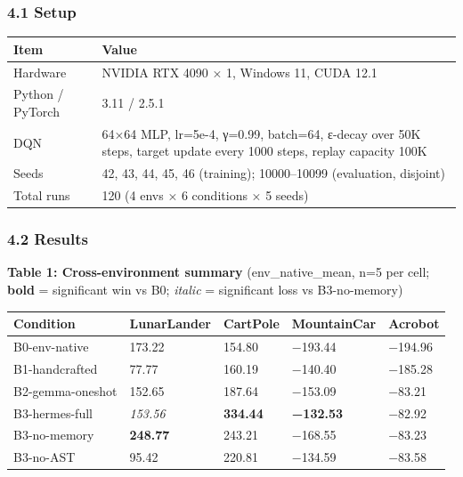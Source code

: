 \subsubsection{4.1 Setup}\label{41-setup}

{\def\LTcaptype{none} %
\begin{longtable}[]{@{}ll@{}}
\toprule\noalign{}
Item & Value \\
\midrule\noalign{}
\endhead
\bottomrule\noalign{}
\endlastfoot
Hardware & NVIDIA RTX 4090 × 1, Windows 11, CUDA 12.1 \\
Python / PyTorch & 3.11 / 2.5.1 \\
DQN & 64×64 MLP, lr=5e-4, γ=0.99, batch=64, ε-decay over 50K steps, target update every 1000 steps, replay capacity 100K \\
Seeds & 42, 43, 44, 45, 46 (training); 10000--10099 (evaluation, disjoint) \\
Total runs & 120 (4 envs × 6 conditions × 5 seeds) \\
\end{longtable}
}

\subsubsection{4.2 Results}\label{42-results}

\textbf{Table 1: Cross-environment summary} (env\_native\_mean, n=5 per cell; \textbf{bold} = significant win vs B0; \emph{italic} = significant loss vs B3-no-memory)

{\def\LTcaptype{none} %
\begin{longtable}[]{@{}lllll@{}}
\toprule\noalign{}
Condition & LunarLander & CartPole & MountainCar & Acrobot \\
\midrule\noalign{}
\endhead
\bottomrule\noalign{}
\endlastfoot
B0-env-native & 173.22 & 154.80 & −193.44 & −194.96 \\
B1-handcrafted & 77.77 & 160.19 & −140.40 & −185.28 \\
B2-gemma-oneshot & 152.65 & 187.64 & −153.09 & −83.21 \\
B3-hermes-full & \emph{153.56} & \textbf{334.44} & \textbf{−132.53} & −82.92 \\
B3-no-memory & \textbf{248.77} & 243.21 & −168.55 & −83.23 \\
B3-no-AST & 95.42 & 220.81 & −134.59 & −83.58 \\
\end{longtable}
}

